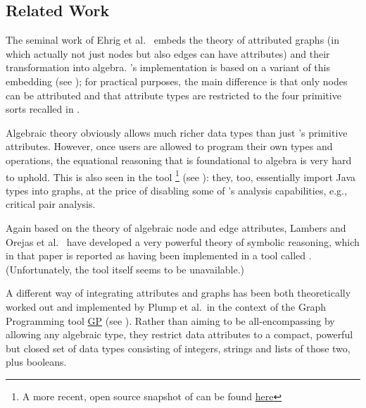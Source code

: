 \subsection{Related Work}
\label{sec:related}

The seminal work of Ehrig et al.\ \cite{Ehrig-attributes} embeds the theory of attributed graphs (in which actually not just nodes but also edges can have attributes) and their transformation into algebra. \GROOVE's implementation is based on a variant of this embedding (see \cite{GROOVE-attributes}); for practical purposes, the main difference is that only nodes can be attributed and that attribute types are restricted to the four primitive sorts recalled in .


Algebraic theory obviously allows much richer data types than just \GROOVE's primitive attributes. However, once users are allowed to program their own types and operations, the equational reasoning that is foundational to algebra is very hard to uphold. This is also seen in the tool \href{https://www.user.tu-berlin.de/o.runge/AGG/WWW/agg.html}{\AGG}\footnote{A more recent, open source snapshot of \AGG can be found \href{https://github.com/Rentenatus/oagg}{here}} (see \cite{AGG,AGG-2}): they, too, essentially import Java types into graphs, at the price of disabling some of \AGG's analysis capabilities, e.g., critical pair analysis.

Again based on the theory of algebraic node and edge attributes, Lambers and Orejas et al.\ \cite{Lambers-attributes} have developed a very powerful theory of symbolic reasoning, which in that paper is reported as having been implemented in a tool called \AutoGraph. (Unfortunately, the tool itself seems to be unavailable.)

\medskip\noindent A different way of integrating attributes and graphs has been both theoretically worked out and implemented by Plump et al.\ in the context of the Graph Programming tool \href{https://github.com/UoYCS-plasma/P-GP2}{GP} (see \cite{GP,GP-2}). Rather than aiming to be all-encompassing by allowing any algebraic type, they restrict data attributes to a compact, powerful but closed set of data types consisting of integers, strings and lists of those two, plus booleans.

